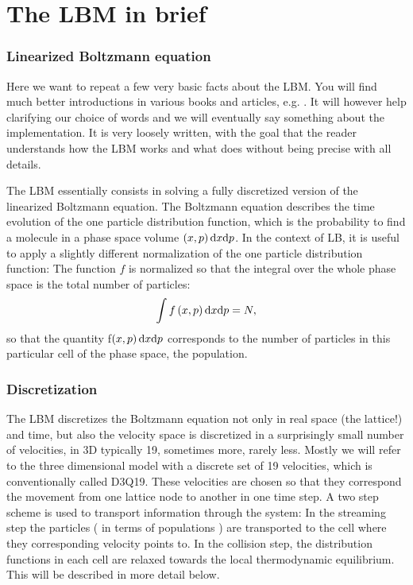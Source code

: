 \chapter{The LBM in brief}

\subsection*{Linearized Boltzmann equation}

Here we want to repeat a few very basic facts about the LBM. 
You will find much better introductions in various books and
articles, e.g. \cite{succi, duenweg}. It will however help clarifying 
our choice of words and we will eventually say something about the 
implementation. It is very loosely written, with the goal that
the reader understands how the LBM works and what \ES{} does without
being precise with all details. 

The LBM essentially consists in solving a fully discretized
version of the linearized Boltzmann equation. The Boltzmann equation
describes the time evolution of the one particle distribution
function, which is the probability to find a molecule in a phase
space volume $\left(x,p\right)\mathrm d x \mathrm d p$. In the context of
LB, it is useful to apply a slightly different normalization of
the one particle distribution function: The function $f$ is normalized
so that the integral over the whole phase space is the total 
number of particles:
\begin{equation*}
  \int f\left(x,p\right)\mathrm d x \mathrm d p = N,
\end{equation*}
so that the quantity f$\left(x,p\right)\mathrm d x \mathrm d p$ corresponds
to the number of particles in this particular cell of the phase
space, the population. \\

\subsection*{Discretization}

The LBM discretizes the Boltzmann equation not only in real
space (the lattice!) and time, but also the velocity space is discretized 
in a surprisingly small number of velocities, in 3D typically
19, sometimes more, rarely less. 
Mostly we will refer to the three dimensional model with a discrete
set of 19 velocities, which is conventionally called D3Q19.
These velocities
are chosen so that they correspond the movement from one lattice
node to another in one time step. A two step scheme is used to transport
information through the system: In the streaming step
the particles ( in terms of populations ) are transported
to the cell where they corresponding velocity points to. 
In the collision step, the distribution functions
in each cell are relaxed towards the local thermodynamic
equilibrium. This will be described in more detail below.

